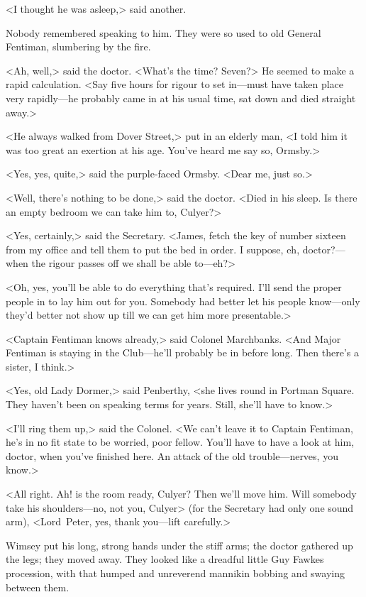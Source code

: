 <I thought he was asleep,> said another.

Nobody remembered speaking to him. They were so used to old General Fentiman, slumbering by the fire.

<Ah, well,> said the doctor. <What's the time? Seven?> He seemed to make a rapid calculation. <Say five hours for rigour to set in—must have taken place very rapidly—he probably came in at his usual time, sat down and died straight away.>

<He always walked from Dover Street,> put in an elderly man, <I told him it was too great an exertion at his age. You've heard me say so, Ormsby.>

<Yes, yes, quite,> said the purple-faced Ormsby. <Dear me, just so.>

<Well, there's nothing to be done,> said the doctor. <Died in his sleep. Is there an empty bedroom we can take him to, Culyer?>

<Yes, certainly,> said the Secretary. <James, fetch the key of number sixteen from my office and tell them to put the bed in order. I suppose, eh, doctor?—when the rigour passes off we shall be able to—eh?>

<Oh, yes, you'll be able to do everything that's required. I'll send the proper people in to lay him out for you. Somebody had better let his people know—only they'd better not show up till we can get him more presentable.>

<Captain Fentiman knows already,> said Colonel Marchbanks. <And Major Fentiman is staying in the Club—he'll probably be in before long. Then there's a sister, I think.>

<Yes, old Lady Dormer,> said Penberthy, <she lives round in Portman Square. They haven't been on speaking terms for years. Still, she'll have to know.>

<I'll ring them up,> said the Colonel. <We can't leave it to Captain Fentiman, he's in no fit state to be worried, poor fellow. You'll have to have a look at him, doctor, when you've finished here. An attack of the old trouble—nerves, you know.>

<All right. Ah! is the room ready, Culyer? Then we'll move him. Will somebody take his shoulders—no, not you, Culyer> (for the Secretary had only one sound arm), <Lord~Peter, yes, thank you—lift carefully.>

Wimsey put his long, strong hands under the stiff arms; the doctor gathered up the legs; they moved away. They looked like a dreadful little Guy Fawkes procession, with that humped and unreverend mannikin bobbing and swaying between them.

